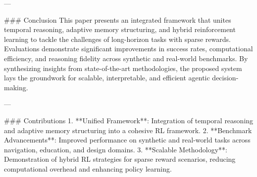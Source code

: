 ---

### Conclusion  
This paper presents an integrated framework that unites temporal reasoning, adaptive memory structuring, and hybrid reinforcement learning to tackle the challenges of long-horizon tasks with sparse rewards. Evaluations demonstrate significant improvements in success rates, computational efficiency, and reasoning fidelity across synthetic and real-world benchmarks. By synthesizing insights from state-of-the-art methodologies, the proposed system lays the groundwork for scalable, interpretable, and efficient agentic decision-making.

---

### Contributions  
1. **Unified Framework**: Integration of temporal reasoning and adaptive memory structuring into a cohesive RL framework.  
2. **Benchmark Advancements**: Improved performance on synthetic and real-world tasks across navigation, education, and design domains.  
3. **Scalable Methodology**: Demonstration of hybrid RL strategies for sparse reward scenarios, reducing computational overhead and enhancing policy learning.  


